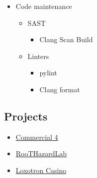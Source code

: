 \begin{itemize}
    \item Code maintenance
    \begin{itemize}
        \item SAST
        \begin{itemize}
            \item Clang Scan Build
        \end{itemize}

        \item Linters
        \begin{itemize}
            \item pylint
            \item Clang format
        \end{itemize}
    \end{itemize}
\end{itemize}

\subsection{Projects}

\begin{itemize}
    \item \hyperlink{proj_com4}{Commercial 4}
    \item \hyperlink{proj_rhl}{RooTHazardLab}
    \item \hyperlink{proj_loxotron}{Loxotron Casino}
\end{itemize}

\newpage
